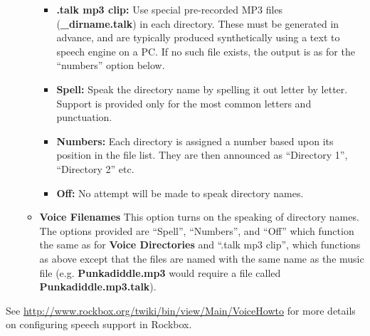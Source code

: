 \begin{itemize}
\begin{itemize}
\begin{itemize}
\item \textbf{.talk mp3 clip: }
Use special pre{}-recorded MP3 files (\textbf{\_dirname.talk}) in each directory.  These must be generated in advance, and are typically produced synthetically using a text to speech engine on a PC.  If no such file exists, the output is as for the ``numbers'' option below.
\item \textbf{Spell: }
Speak the directory name by spelling it out letter
by letter.  Support is provided only for the most common letters and
punctuation.
\item \textbf{Numbers: }
Each directory is assigned a number based upon its position in the file list.  They are then announced as ``Directory 1'', ``Directory 2'' etc.
\item \textbf{Off: }
No attempt will be made to speak directory names.
\end{itemize}

\item \textbf{Voice Filenames}
This option turns on the speaking of directory names.  The options
provided are ``Spell'', ``Numbers'', and ``Off'' which function the same as for \textbf{Voice Directories} and ``.talk mp3 clip'', which functions as above except that the files are named with the same name as the music file (e.g. \textbf{Punkadiddle.mp3 } would require a file called \textbf{Punkadiddle.mp3.talk}).
\end{itemize}
\end{itemize}
See
\url{http://www.rockbox.org/twiki/bin/view/Main/VoiceHowto} for more details on configuring speech support in Rockbox.

